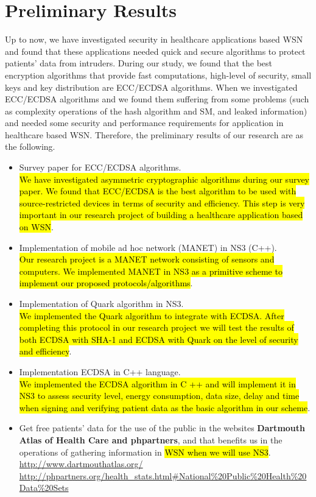 \documentclass[a4paper,11pt]{article}
\DeclareRobustCommand{\hlyellow}[1]{{\sethlcolor{white}\hl{#1}}}
\begin{document}
\section{Preliminary Results}
Up to now, we have investigated security in healthcare applications based WSN and found that these applications needed quick and secure algorithms to protect patients' data from intruders. During our study, we found that the best encryption algorithms that provide fast computations, high-level of security, small keys and key distribution are ECC/ECDSA algorithms. When we investigated ECC/ECDSA algorithms and we found them suffering from some problems (such as complexity operations of the hash algorithm and SM, and leaked information) and needed some security and performance requirements for application in healthcare based WSN. Therefore, the preliminary results of our research are as the following.

\begin{itemize}
\item Survey paper for ECC/ECDSA algorithms.\\
\hlyellow{We have investigated asymmetric cryptographic algorithms during our survey paper. We found that ECC/ECDSA is the best algorithm to be used with source-restricted devices in terms of security and efficiency. This step is very important in our research project of building a healthcare application based on WSN}.

\item Implementation of mobile ad hoc network (MANET) in NS3 (C++).\\
\hlyellow{Our research project is a MANET network consisting of sensors and computers. We implemented MANET in NS3 as a primitive scheme to implement our proposed protocols/algorithms}.

\item Implementation of Quark algorithm in NS3.\\
\hlyellow{We implemented the Quark algorithm to integrate with ECDSA. After completing this protocol in our research project we will test the results of both ECDSA with SHA-1 and ECDSA with Quark on the level of security and efficiency}.

\item Implementation ECDSA in C++ language.\\
\hlyellow{We implemented the ECDSA algorithm in C ++ and will implement it in NS3 to assess security level, energy consumption, data size, delay and time when signing and verifying patient data as the basic algorithm in our scheme}.

\item Get free patients' data for the use of the public in the websites \textbf{Dartmouth Atlas of Health Care and phpartners}, and that benefits us in the operations of gathering information in \hlyellow{WSN when we will use NS3}.\\
\url{http://www.dartmouthatlas.org/}\\
\url{http://phpartners.org/health_stats.html#National%20Public%20Health%20Data%20Sets}

\end{itemize}


\clearpage
\onehalfspacing


\end{document}
